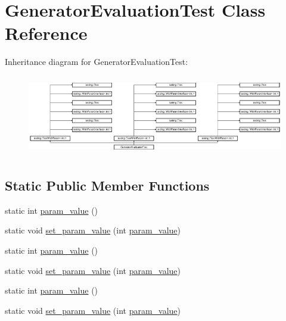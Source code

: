 \hypertarget{class_generator_evaluation_test}{}\section{Generator\+Evaluation\+Test Class Reference}
\label{class_generator_evaluation_test}
Inheritance diagram for Generator\+Evaluation\+Test\+:\begin{figure}[H]
\begin{center}
\leavevmode
\includegraphics[height=3.572568cm]{d9/d59/class_generator_evaluation_test}
\end{center}
\end{figure}
\subsection*{Static Public Member Functions}
\begin{DoxyCompactItemize}
\item 
static int \mbox{\hyperlink{class_generator_evaluation_test_ac819769e32b738677401424deb3c8cbe}{param\+\_\+value}} ()
\item 
static void \mbox{\hyperlink{class_generator_evaluation_test_ae4f5fb96577dd680d9fa1fd6c3c4af46}{set\+\_\+param\+\_\+value}} (int \mbox{\hyperlink{class_generator_evaluation_test_ac819769e32b738677401424deb3c8cbe}{param\+\_\+value}})
\item 
static int \mbox{\hyperlink{class_generator_evaluation_test_ac819769e32b738677401424deb3c8cbe}{param\+\_\+value}} ()
\item 
static void \mbox{\hyperlink{class_generator_evaluation_test_ae4f5fb96577dd680d9fa1fd6c3c4af46}{set\+\_\+param\+\_\+value}} (int \mbox{\hyperlink{class_generator_evaluation_test_ac819769e32b738677401424deb3c8cbe}{param\+\_\+value}})
\item 
static int \mbox{\hyperlink{class_generator_evaluation_test_ac819769e32b738677401424deb3c8cbe}{param\+\_\+value}} ()
\item 
static void \mbox{\hyperlink{class_generator_evaluation_test_ae4f5fb96577dd680d9fa1fd6c3c4af46}{set\+\_\+param\+\_\+value}} (int \mbox{\hyperlink{class_generator_evaluation_test_ac819769e32b738677401424deb3c8cbe}{param\+\_\+value}})
\end{DoxyCompactItemize}
